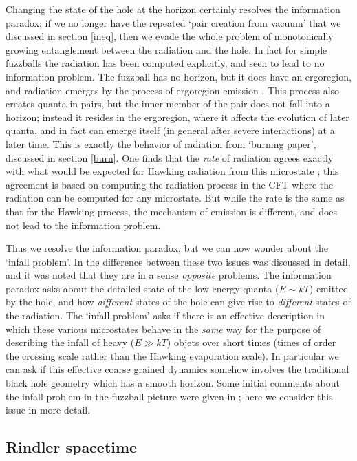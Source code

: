 \documentclass[12pt]{article}
\begin{document}
Changing the state of the hole at the horizon certainly resolves the information paradox; if we no longer have the repeated `pair creation from vacuum' that we discussed in section  \ref{ineq}, then we evade the whole problem of monotonically growing entanglement between the radiation and the hole. In fact for simple fuzzballs the radiation has been computed explicitly, and seen to lead to no information problem. The fuzzball has no horizon, but it does have an ergoregion, and radiation emerges by the process of ergoregion emission \cite{ross,myers}. This process also creates quanta in pairs, but the inner member of the pair does not fall into a horizon; instead it resides in the ergoregion, where it affects the evolution of later quanta, and in fact can emerge itself (in general after severe interactions) at a later time. This is exactly the behavior of radiation from `burning paper', discussed in section  \ref{burn}. One finds that the {\it rate} of radiation agrees exactly with what would be expected for Hawking radiation from this microstate\cite{cm1} ; this agreement is based on computing the radiation process in the CFT where the radiation can be computed for any microstate. But while the rate is the same as that for the Hawking process, the mechanism of emission is different, and does not lead to the information problem.

Thus we resolve the information paradox, but we can now wonder about the `infall problem'. In \cite{mathurrecent} the difference between these two issues was discussed in detail, and it was noted that they are in a sense {\it opposite} problems. The information paradox asks about the detailed state of the low energy quanta ($E\sim kT$) emitted by the hole, and how {\it different} states of the hole can  give rise to {\it different} states of the radiation. The `infall problem' asks if there is an effective description in which these various microstates behave in the {\it same} way for the purpose of describing  the infall of heavy ($E\gg kT$) objets over short times (times of order the crossing scale rather than the Hawking evaporation scale).  In particular we can ask if this effective coarse grained dynamics somehow involves the traditional black hole geometry which has a smooth horizon. Some initial comments about the infall problem in the fuzzball picture were given in \cite{mathurrecent}; here we consider this issue in more detail. 

\subsection{Rindler spacetime}
\end{document}
